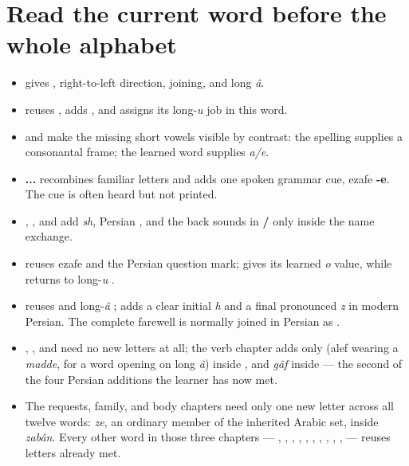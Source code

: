 \section*{Read the current word before the whole alphabet}

\begin{itemize}
\raggedright
\setlength{\itemsep}{0.35em}
  \item \textbf{} gives \textbf{   }, right-to-left direction, joining, and long \emph{â}.
  \item \textbf{} reuses \textbf{}, adds \textbf{ }, and assigns \textbf{} its long-\emph{u} job in this word.
  \item \textbf{} and \textbf{} make the missing short vowels visible by contrast: the spelling supplies a consonantal frame; the learned word supplies \emph{a/e}.
  \item \textbf{  ... } recombines familiar letters and adds one spoken grammar cue, ezafe \textbf{-e}. The cue is often heard but not printed.
  \item \textbf{}, \textbf{}, and \textbf{} add \emph{sh}, Persian \textbf{}, and the back sounds in \textbf{/} only inside the name exchange.
  \item \textbf{   } reuses ezafe and the Persian question mark; \textbf{} gives \textbf{} its learned \emph{o} value, while \textbf{} returns to long-\emph{u} \textbf{}.
  \item \textbf{} reuses \textbf{} and long-\emph{â} \textbf{}; \textbf{} adds a clear initial \emph{h} and a final \textbf{} pronounced \emph{z} in modern Persian. The complete farewell is normally joined in Persian as \textbf{}.
  \item \textbf{}, \textbf{}, and \textbf{} need no new letters at all; the verb chapter adds only \textbf{} (alef wearing a \emph{madde}, for a word opening on long \emph{â}) inside \textbf{}, and \textbf{} \emph{gâf} inside \textbf{} — the second of the four Persian additions \textbf{   } the learner has now met.
  \item The requests, family, and body chapters need only one new letter across all twelve words: \textbf{} \emph{ze}, an ordinary member of the inherited Arabic set, inside \textbf{} \emph{zabân}. Every other word in those three chapters — \textbf{}, \textbf{}, \textbf{}, \textbf{}, \textbf{}, \textbf{}, \textbf{}, \textbf{}, \textbf{}, \textbf{}, \textbf{} — reuses letters already met.

\end{itemize}
